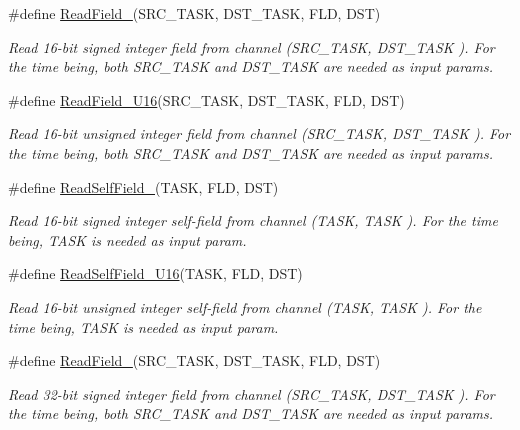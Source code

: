 \begin{DoxyCompactItemize}
\#define \hyperlink{group__interpow__read__write_ga419c870d721751b80a9e21b571351f4d}{Read\+Field\+\_}(S\+R\+C\+\_\+\+T\+A\+SK,  D\+S\+T\+\_\+\+T\+A\+SK,  F\+LD,  D\+ST)
\begin{DoxyCompactList}\small\item\em Read 16-\/bit signed integer field from channel ({\itshape S\+R\+C\+\_\+\+T\+A\+SK}, {\itshape D\+S\+T\+\_\+\+T\+A\+SK} ). For the time being, both S\+R\+C\+\_\+\+T\+A\+SK and D\+S\+T\+\_\+\+T\+A\+SK are needed as input params. \end{DoxyCompactList}\item 
\#define \hyperlink{group__interpow__read__write_ga2e7b75867ded3353c718dfaf3988a871}{Read\+Field\+\_\+\+U16}(S\+R\+C\+\_\+\+T\+A\+SK,  D\+S\+T\+\_\+\+T\+A\+SK,  F\+LD,  D\+ST)
\begin{DoxyCompactList}\small\item\em Read 16-\/bit unsigned integer field from channel ({\itshape S\+R\+C\+\_\+\+T\+A\+SK}, {\itshape D\+S\+T\+\_\+\+T\+A\+SK} ). For the time being, both S\+R\+C\+\_\+\+T\+A\+SK and D\+S\+T\+\_\+\+T\+A\+SK are needed as input params. \end{DoxyCompactList}\item 
\#define \hyperlink{group__interpow__read__write_gaae12bee359089f39212526e5a186648e}{Read\+Self\+Field\+\_}(T\+A\+SK,  F\+LD,  D\+ST)
\begin{DoxyCompactList}\small\item\em Read 16-\/bit signed integer self-\/field from channel ({\itshape T\+A\+SK}, {\itshape T\+A\+SK} ). For the time being, T\+A\+SK is needed as input param. \end{DoxyCompactList}\item 
\#define \hyperlink{group__interpow__read__write_gad1fd8a223e580fafd6bf4a1b55d06b5f}{Read\+Self\+Field\+\_\+\+U16}(T\+A\+SK,  F\+LD,  D\+ST)
\begin{DoxyCompactList}\small\item\em Read 16-\/bit unsigned integer self-\/field from channel ({\itshape T\+A\+SK}, {\itshape T\+A\+SK} ). For the time being, T\+A\+SK is needed as input param. \end{DoxyCompactList}\item 
\#define \hyperlink{group__interpow__read__write_gafbde9dd679e81ac365418deb8ccb24f8}{Read\+Field\+\_}(S\+R\+C\+\_\+\+T\+A\+SK,  D\+S\+T\+\_\+\+T\+A\+SK,  F\+LD,  D\+ST)
\begin{DoxyCompactList}\small\item\em Read 32-\/bit signed integer field from channel ({\itshape S\+R\+C\+\_\+\+T\+A\+SK}, {\itshape D\+S\+T\+\_\+\+T\+A\+SK} ). For the time being, both S\+R\+C\+\_\+\+T\+A\+SK and D\+S\+T\+\_\+\+T\+A\+SK are needed as input params. \end{DoxyCompactList}\item 

\end{DoxyCompactItemize}
